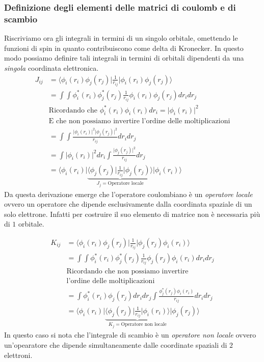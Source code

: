 \documentclass[oneside]{amsbook}
\numberwithin{section}{chapter}
\numberwithin{equation}{section}
\numberwithin{figure}{section}
\begin{document}
\subsubsection{Definizione degli elementi delle matrici di coulomb e di scambio} Riscriviamo ora gli integrali in termini di un singolo orbitale, omettendo le funzioni di spin in quanto contribuiscono come delta di Kronecker. In questo modo possiamo definire tali integrali in termini di orbitali dipendenti da una \emph{singola} coordinata elettronica.
 \begin{equation}
 \begin{aligned}
J_{ij}&=\langle\phi_i(r_i) \phi_j(r_j)\vert\frac{1}{r_{ij}}\vert\phi_i(r_i) \phi_j(r_j)\rangle  \\
&= \int \int \phi_i^*(r_i) \phi_j^*(r_j)\frac{1}{r_{ij}}    \phi_i(r_i) \phi_j(r_j) dr_i dr_j \\
&\text{Ricordando che }\phi_i^*(r_i)\phi_i(r_i)dr_i =\vert\phi_i(r_i)\vert^2	 \\
&\text{E che non possiamo invertire l'ordine delle moltiplicazioni}\\
&= \int \int \frac{\vert\phi_i(r_i)\vert^2\vert\phi_j(r_j)\vert^2}{r_{ij}}dr_i dr_j \\
&= \int \vert\phi_i(r_i)\vert^2dr_i \int \frac{\vert\phi_j(r_j)\vert^2}{r_{ij}}dr_j \\
&=\langle\phi_i(r_i)\vert\underbrace{\langle\phi_j(r_j)\vert\frac{1}{r_{ij}}\vert\phi_j(r_j)\rangle}_{J_j=\text{Operatore locale}}\vert\phi_i(r_i)\rangle
 \end{aligned}
\end{equation}
Da questa derivazione emerge che l'operatore coulombiano è un \emph{operatore locale} ovvero un operatore che dipende esclusivamente dalla coordinata spaziale di un solo elettrone. Infatti per costruire il suo elemento di matrice non è necessaria più di $1$ orbitale.

 \begin{equation}
 \begin{aligned}
K_{ij}&=\langle\phi_i(r_i) \phi_j(r_j)\vert\frac{1}{r_{ij}}\vert \phi_j(r_j)\phi_i(r_i)\rangle  \\
&= \int \int \phi_i^*(r_i) \phi_j^*(r_j)\frac{1}{r_{ij}}  \phi_j(r_j)\phi_i(r_i) dr_i dr_j \\
&\text{Ricordando che non possiamo invertire} \\ &\text{l'ordine delle moltiplicazioni}\\
&= \int \phi_i^*(r_i)\phi_j(r_j)dr_idr_j \int \frac{\phi_j^*(r_j)\phi_i(r_i)}{r_{ij}}dr_idr_j \\
&=\langle\phi_i(r_i)\vert\underbrace{\langle\phi_j(r_j)\vert\frac{1}{r_{ij}}\vert\phi_i(r_i)\rangle}_{K_j=\text{Operatore non locale}}\vert\phi_j(r_j)\rangle
 \end{aligned}
\end{equation}
 In questo caso si nota che l'integrale di scambio è un  \emph{operatore non locale} ovvero un'opearatore che dipende simultaneamente dalle coordinate spaziali di $2$ elettroni.
\end{document}
